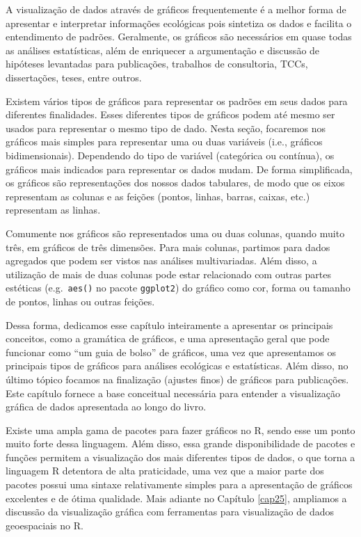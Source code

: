 \documentclass[
]{article}
\begin{document}
A visualização de dados através de gráficos frequentemente é a melhor forma de apresentar e interpretar informações ecológicas pois sintetiza os dados e facilita o entendimento de padrões. Geralmente, os gráficos são necessários em quase todas as análises estatísticas, além de enriquecer a argumentação e discussão de hipóteses levantadas para publicações, trabalhos de consultoria, TCCs, dissertações, teses, entre outros.

Existem vários tipos de gráficos para representar os padrões em seus dados para diferentes finalidades. Esses diferentes tipos de gráficos podem até mesmo ser usados para representar o mesmo tipo de dado. Nesta seção, focaremos nos gráficos mais simples para representar uma ou duas variáveis (i.e., gráficos bidimensionais). Dependendo do tipo de variável (categórica ou contínua), os gráficos mais indicados para representar os dados mudam. De forma simplificada, os gráficos são representações dos nossos dados tabulares, de modo que os eixos representam as colunas e as feições (pontos, linhas, barras, caixas, etc.) representam as linhas.

Comumente nos gráficos são representados uma ou duas colunas, quando muito três, em gráficos de três dimensões. Para mais colunas, partimos para dados agregados que podem ser vistos nas análises multivariadas. Além disso, a utilização de mais de duas colunas pode estar relacionado com outras partes estéticas (e.g.~\texttt{aes()} no pacote \texttt{ggplot2}) do gráfico como cor, forma ou tamanho de pontos, linhas ou outras feições.

Dessa forma, dedicamos esse capítulo inteiramente a apresentar os principais conceitos, como a gramática de gráficos, e uma apresentação geral que pode funcionar como ``um guia de bolso'' de gráficos, uma vez que apresentamos os principais tipos de gráficos para análises ecológicas e estatísticas. Além disso, no último tópico focamos na finalização (ajustes finos) de gráficos para publicações. Este capítulo fornece a base conceitual necessária para entender a visualização gráfica de dados apresentada ao longo do livro.

Existe uma ampla gama de pacotes para fazer gráficos no R, sendo esse um ponto muito forte dessa linguagem. Além disso, essa grande disponibilidade de pacotes e funções permitem a visualização dos mais diferentes tipos de dados, o que torna a linguagem R detentora de alta praticidade, uma vez que a maior parte dos pacotes possui uma sintaxe relativamente simples para a apresentação de gráficos excelentes e de ótima qualidade. Mais adiante no Capítulo \ref{cap25}, ampliamos a discussão da visualização gráfica com ferramentas para visualização de dados geoespaciais no R.
\end{document}
